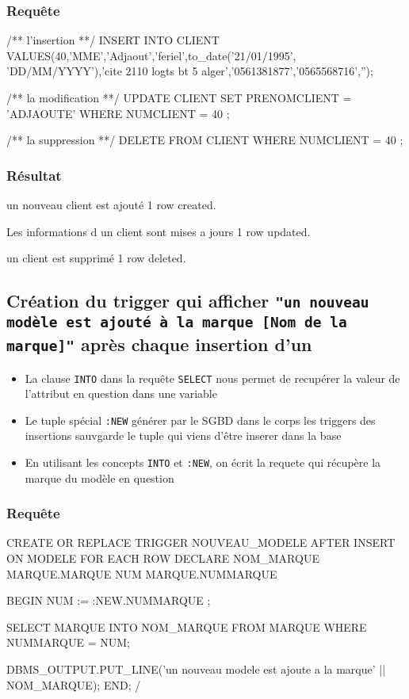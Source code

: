 \documentclass[•]{article}
\begin{document}
\subsubsection{Requête}
\begin{sql}
/** l'insertion **/
INSERT INTO CLIENT 
VALUES(40,'MME','Adjaout','feriel',to_date('21/01/1995', 'DD/MM/YYYY'),'cite 2110 logts bt 5 alger','0561381877','0565568716','');

/** la modification **/
UPDATE CLIENT 
SET PRENOMCLIENT = 'ADJAOUTE' 
WHERE NUMCLIENT = 40 ;

/** la suppression **/
DELETE FROM CLIENT 
WHERE NUMCLIENT = 40 ;

\end{sql}
\subsubsection{Résultat}
\begin{sql}
un nouveau client est ajouté
1 row created.

Les informations d un client sont mises a jours
1 row updated.

un client est supprimé
1 row deleted.
\end{sql}

\subsection{Création du trigger qui afficher \texttt{"un nouveau modèle est ajouté à la marque [Nom de la marque]"}
après chaque insertion d'un}

\begin{itemize}
\item
La clause \texttt{INTO} dans la requête \texttt{SELECT} nous permet de recupérer la 
valeur de l'attribut en question dans une variable
\item
Le tuple spécial \texttt{:NEW} générer par le SGBD dans le corps les triggers des insertions 
sauvgarde le tuple qui viens d'être inserer dans la base
\item
En utilisant les concepts \texttt{INTO} et \texttt{:NEW}, on écrit la requete qui récupère la marque du modèle en question
\end{itemize}


\subsubsection{Requête}
\begin{sql}
CREATE OR REPLACE TRIGGER NOUVEAU_MODELE
AFTER INSERT ON MODELE
FOR EACH ROW
DECLARE 
NOM_MARQUE MARQUE.MARQUE%
NUM MARQUE.NUMMARQUE%

BEGIN
    NUM := :NEW.NUMMARQUE ;

	SELECT MARQUE INTO NOM_MARQUE
	FROM MARQUE WHERE NUMMARQUE = NUM;


	DBMS_OUTPUT.PUT_LINE('un nouveau modele est ajoute a la marque' || NOM_MARQUE);
END;
/
\end{sql}
\end{document}
